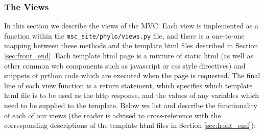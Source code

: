 \documentclass[12pt,a4paper]{article}
\begin{document}
\subsubsection{The Views}
\label{sec:views}
In this section we describe the views of the MVC. Each view is implemented as a function within the \texttt{msc\_site/phylo/views.py} file, and there is a one-to-one mapping between these methods and the template html files described in Section \ref{sec:front_end}. Each template html page is a mixture of static html (as well as other common web components such as javascript or css style directives) and snippets of python code which are executed when the page is requested. The final line of each view function is a return statement, which specifies which template html file is to be used as the http response, and the values of any variables which need to be supplied to the template. Below we list and describe the functionality of each of our views (the reader is advised to cross-reference with the corresponding descriptions of the template html files in Section \ref{sec:front_end}):
\end{document}
